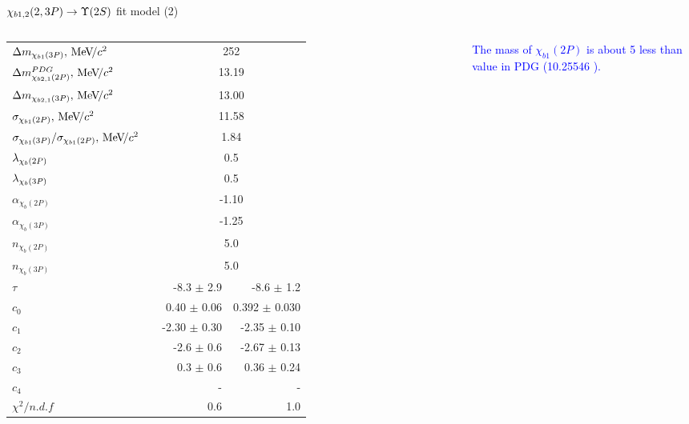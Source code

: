 \begin{frame}{$\chi_{b1,2}(2,3P) \to \TwoS$ fit model (2)}
\begin{columns}[T]
{\begin{tabular}{lrrr}
    $\Delta m_{\chi_{b 1}(3P)}, {\mathrm{\,Me\kern -0.1em V\!/}c^2}$  && \multicolumn{2}{c}{252} \\
    \rule{0pt}{4ex}$\Delta m_{\chi_{b2,1}(2P)}^{PDG}, {\mathrm{\,Me\kern -0.1em V\!/}c^2}$  && \multicolumn{2}{c}{13.19} \\
    $\Delta m_{\chi_{b2,1}(3P)}, {\mathrm{\,Me\kern -0.1em V\!/}c^2}$  && \multicolumn{2}{c}{13.00} \\

    \rule{0pt}{4ex}$\sigma_{\chi_{b1}(2P)}, {\mathrm{\,Me\kern -0.1em V\!/}c^2}$  && \multicolumn{2}{c}{11.58} \\
    $\sigma_{\chi_{b1}(3P)} / \sigma_{\chi_{b1}(2P)}, {\mathrm{\,Me\kern -0.1em V\!/}c^2}$  && \multicolumn{2}{c}{1.84} \\

    \rule{0pt}{4ex}$\lambda_{\chi_{b}(2P)}$  && \multicolumn{2}{c}{0.5} \\
    $\lambda_{\chi_{b}(3P)}$  && \multicolumn{2}{c}{0.5} \\

    \rule{0pt}{4ex}$\alpha_{\chi_{b}(2P)}$  && \multicolumn{2}{c}{-1.10} \\
    $\alpha_{\chi_{b}(3P)}$  && \multicolumn{2}{c}{-1.25} \\

    \rule{0pt}{4ex}$n_{\chi_{b}(2P)}$  && \multicolumn{2}{c}{5.0} \\
    $n_{\chi_{b}(3P)}$  && \multicolumn{2}{c}{5.0} \\

    \rule{0pt}{4ex}$\tau$  && -8.3 $\pm$ 2.9 & -8.6 $\pm$ 1.2 \\
    $c_0$  && 0.40 $\pm$ 0.06 & 0.392 $\pm$ 0.030 \\
    $c_1$  && -2.30 $\pm$ 0.30 & -2.35 $\pm$ 0.10 \\
    $c_2$  && -2.6 $\pm$ 0.6 & -2.67 $\pm$ 0.13 \\
    $c_3$  && 0.3 $\pm$ 0.6 & 0.36 $\pm$ 0.24 \\
    $c_4$  &&  -  &  -  \\

    \rule{0pt}{4ex}$\chi^2 / n.d.f$  && 0.6 & 1.0 \\
    \bottomrule
\end{tabular}
}

\bigskip
{\tiny \textcolor{blue}{The mass of $\chi_{b1}(2P)$  is about 5 \mevcc  less than value in PDG (10.25546 \mevcc).}}
\end{columns}


\end{frame}
